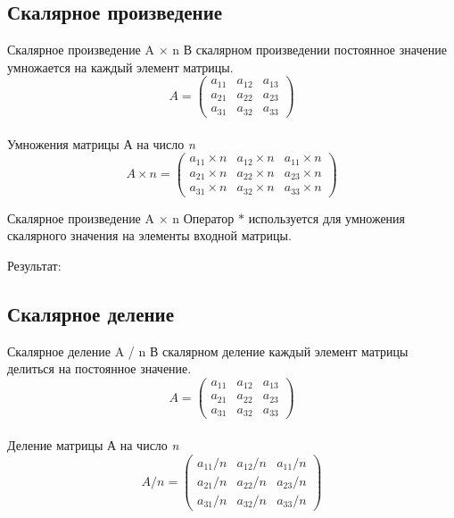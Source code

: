 \documentclass[12pt]{beamer}
\begin{document}
\subsection{Скалярное произведение}
\begin{frame}{Скалярное произведение A $\times$ n}
В скалярном произведении постоянное значение умножается на каждый элемент матрицы.\\
\[
  A = 
  \begin{pmatrix}
    a_{11} & a_{12} & a_{13}\\
    a_{21} & a_{22} & a_{23}\\
    a_{31} & a_{32} & a_{33}
  \end{pmatrix}
\]
\\
\vspace{0.5cm}
Умножения матрицы А на число \emph{n}
\\
\[
  A \times n = 
  \begin{pmatrix}
    a_{11} \times n & a_{12} \times n & a_{11} \times n \\
    a_{21} \times n & a_{22} \times n & a_{23} \times n \\
    a_{31} \times n & a_{32} \times n & a_{33} \times n
  \end{pmatrix}
\]
\end{frame}


\begin{frame}{Скалярное произведение  A $\times$ n}
Оператор $*$ используется для умножения скалярного значения на элементы входной матрицы.
\vspace{0.2cm}

Результат: \\

\end{frame}


\subsection{Скалярное деление}
\begin{frame}{Скалярное деление A / n}
В скалярном деление каждый элемент матрицы делиться на постоянное значение.\\
\[
  A = 
  \begin{pmatrix}
    a_{11} & a_{12} & a_{13}\\
    a_{21} & a_{22} & a_{23}\\
    a_{31} & a_{32} & a_{33}
  \end{pmatrix}
\]
\\
\vspace{0.5cm}
Деление матрицы А на число \emph{n}
\\
\[
  A / n = 
  \begin{pmatrix}
    a_{11} / n & a_{12} / n & a_{11} / n \\
    a_{21} / n & a_{22} / n & a_{23} / n \\
    a_{31} / n & a_{32} / n & a_{33} / n
  \end{pmatrix}
\]
\end{frame}
\end{document}

